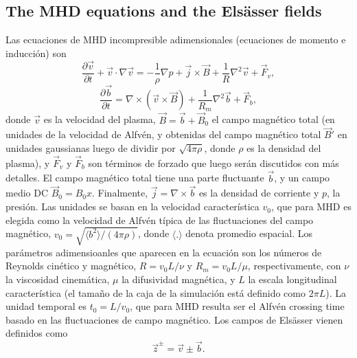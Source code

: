 \subsection{The MHD equations and the Els\"asser fields}\label{sec_eq}
Las ecuaciones de MHD incompresible adimensionales (ecuaciones de
momento e inducción) son
\begin{equation}\label{eq:MHD_v}
  \frac {\partial \vec{v}}{\partial t} +
  \vec{v }\cdot \nabla \vec{v} = -\frac{1}{\rho}\nabla p +
  \vec{j} \times \vec{B} + \frac{1}{R} \nabla^2\vec{v} + \vec{F}_v,
\end{equation}
\begin{equation}\label{eq:MHD_b}
  \frac{\partial \vec{b}}{\partial t} = \nabla \times (\vec{v} 
  \times \vec{B}) + \frac{1}{R_m} \nabla^2 \vec{b} + \vec{F}_b,
\end{equation}
donde $\vec{v}$ es la velocidad del plasma,
$\vec{B} = \vec{b} + \vec{B}_0$ el campo magnético total (en unidades
de la velocidad de Alfvén, y obtenidas del campo magnético total
$\vec{B}'$ en unidades gaussianas luego de dividir por
$\sqrt{4\pi\rho}$, donde $\rho$ es la densidad del plasma), y
$\vec{F}_v$ y $\vec{F}_b$ son términos de forzado que luego serán
discutidos con más detalles.  El campo magnético total tiene una parte
fluctuante $\vec{b}$, y un campo medio DC
$\vec{B}_0=B_0\hat{x}$. Finalmente, $\vec{j} = \nabla \times \vec{b}$
es la densidad de corriente y $p$, la presión. Las unidades se basan
en la velocidad característica $v_0$, que para MHD es elegida como la
velocidad de Alfvén típica de las fluctuaciones del campo magnético,
$v_0 = \sqrt{\langle b^2 \rangle /(4\pi\rho)}$, donde
$\langle . \rangle$ denota promedio espacial. Los parámetros
adimensioanles que aparecen en la ecuación son los números de Reynolds
cinético y magnético, $R=v_0 L/\nu$ y $R_m = v_0 L /\mu$,
respectivamente, con $\nu$ la viscosidad cinemática, $\mu$ la
difusividad magnética, y $L$ la escala longitudinal característica (el
tamaño de la caja de la simulación está definido como $2\pi L$). La
unidad temporal es $t_0 = L/v_0$, que para MHD resulta ser el
{\color{red} Alfv\'en crossing time} basado en las fluctuaciones de
campo magnético. Los campos de Els\"asser vienen definidos como
\begin{equation}\label{eq:MHD_zdef}
\vec{z}^\pm = \vec{v} \pm \vec{b} .
\end{equation}

